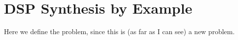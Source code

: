 \section{DSP Synthesis by Example}

Here we define the problem, since this is (as far as I can see) a new problem.

